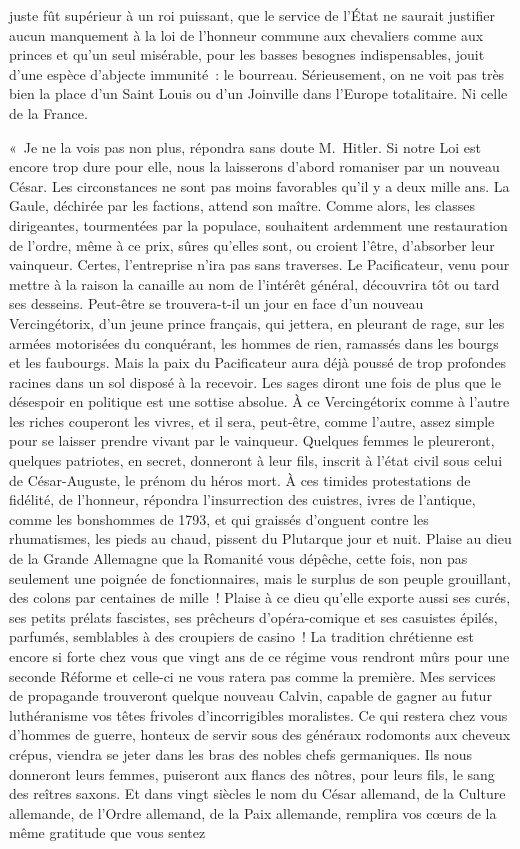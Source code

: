 \documentclass[french,twoside]{book} %
\begin{document}
juste fût supérieur à un roi puissant, que le service de l’État ne saurait justifier aucun manquement à la loi de l’honneur commune aux chevaliers comme aux princes et qu’un seul misérable, pour les basses besognes indispensables, jouit d’une espèce d’abjecte immunité : le bourreau. Sérieusement, on ne voit pas très bien la place d’un Saint Louis ou d’un Joinville dans l’Europe totalitaire. Ni celle de la France.\par
« Je ne la vois pas non plus, répondra sans doute M. Hitler. Si notre Loi est encore trop dure pour elle, nous la laisserons d’abord romaniser par un nouveau César. Les circonstances ne sont pas moins favorables qu’il y a deux mille ans. La Gaule, déchirée par les factions, attend son maître. Comme alors, les classes dirigeantes, tourmentées par la populace, souhaitent ardemment une restauration de l’ordre, même à ce prix, sûres qu’elles sont, ou croient l’être, d’absorber leur vainqueur. Certes, l’entreprise n’ira pas sans traverses. Le Pacificateur, venu pour mettre à la raison la canaille au nom de l’intérêt général, découvrira tôt ou tard ses desseins. Peut-être se trouvera-t-il un jour en face d’un nouveau Vercingétorix, d’un jeune prince français, qui jettera, en pleurant de rage, sur les armées motorisées du conquérant, les hommes de rien, ramassés dans les bourgs et les faubourgs. Mais la paix du Pacificateur aura déjà poussé de trop profondes racines dans un sol disposé à la recevoir. Les sages diront une fois de plus que le désespoir en politique est une sottise absolue. À ce Vercingétorix comme à l’autre les riches couperont les vivres, et il sera, peut-être, comme l’autre, assez simple pour se laisser prendre vivant par le vainqueur. Quelques femmes le pleureront, quelques patriotes, en secret, donneront à leur fils, inscrit à l’état civil sous celui de César-Auguste, le prénom du héros mort. À ces timides protestations de fidélité, de l’honneur, répondra l’insurrection des cuistres, ivres de l’antique, comme les bonshommes de 1793, et qui graissés d’onguent contre les rhumatismes, les pieds au chaud, pissent du Plutarque jour et nuit. Plaise au dieu de la Grande Allemagne que la Romanité vous dépêche, cette fois, non pas seulement une poignée de fonctionnaires, mais le surplus de son peuple grouillant, des colons par centaines de mille ! Plaise à ce dieu qu’elle exporte aussi ses curés, ses petits prélats fascistes, ses prêcheurs d’opéra-comique et ses casuistes épilés, parfumés, semblables à des croupiers de casino ! La tradition chrétienne est encore si forte chez vous que vingt ans de ce régime vous rendront mûrs pour une seconde Réforme et celle-ci ne vous ratera pas comme la première. Mes services de propagande trouveront quelque nouveau Calvin, capable de gagner au futur luthéranisme vos têtes frivoles d’incorrigibles moralistes. Ce qui restera chez vous d’hommes de guerre, honteux de servir sous des généraux rodomonts aux cheveux crépus, viendra se jeter dans les bras des nobles chefs germaniques. Ils nous donneront leurs femmes, puiseront aux flancs des nôtres, pour leurs fils, le sang des reîtres saxons. Et dans vingt siècles le nom du César allemand, de la Culture allemande, de l’Ordre allemand, de la Paix allemande, remplira vos cœurs de la même gratitude que vous sentez 
\end{document}
